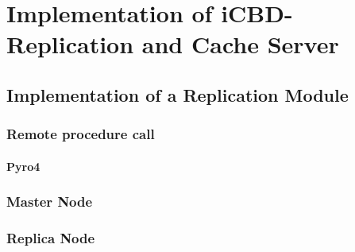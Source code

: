 \chapter{Implementation of iCBD-Replication and Cache Server}
\label{cha:replication}


\section{Implementation of a Replication Module}
\label{sec:replication_impl}

\subsection{Remote procedure call}
\label{sub:rpcs}

\subsubsection{Pyro4}
\label{subsub:pyro4}


\subsection{Master Node}
\label{sub:master_node}

\subsection{Replica Node}
\label{sub:replica_node}


